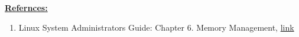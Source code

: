 \documentclass[12pt]{article}
\begin{document}
\begin{itemize}
    \bigskip

    \underline{\textbf{Refernces:}}

    \bigskip

    \begin{enumerate}[1)]
        \item Linux System Administrators Guide: Chapter 6. Memory Management, \href{https://www.tldp.org/LDP/sag/html/buffer-cache.html}{link}
    \end{enumerate}
\end{itemize}
\end{document}
